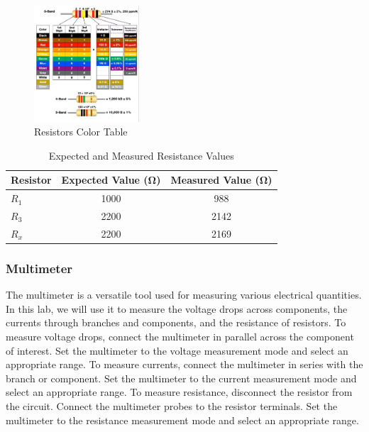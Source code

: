 \documentclass[a4paper, 10pt]{article}
\begin{document}
				\begin{figure}[h!]
					\centering
					\includegraphics[width=0.35\textwidth]{images/ResistorColorCode.png}
					\caption{Resistors Color Table}
					\label{fig:ResistorsColorTable}
				\end{figure}

	
				\begin{table}[h!]
					\centering
					\begin{tabular}{@{}l|S|S@{}} %
						\toprule
						{Resistor} & {Expected Value (\si{\ohm})} & {Measured Value (\si{\ohm})} \\
						\midrule
						$R_1$ & 1000 & 988 \\
						$R_3$ & 2200 & 2142 \\
						$R_x$ & 2200 & 2169 \\
						\bottomrule
					\end{tabular}
					\caption{Expected and Measured Resistance Values}
					\label{tab:resistors}
				\end{table}

			\pagebreak
			\subsubsection{Multimeter}
				The multimeter is a versatile tool used for measuring various electrical quantities. In this lab, we will use it to measure the voltage drops across components, the currents through branches and components, and the resistance of resistors.
				To measure voltage drops, connect the multimeter in parallel across the component of interest. Set the multimeter to the voltage measurement mode and select an appropriate range.
				To measure currents, connect the multimeter in series with the branch or component. Set the multimeter to the current measurement mode and select an appropriate range.
				To measure resistance, disconnect the resistor from the circuit. Connect the multimeter probes to the resistor terminals. Set the multimeter to the resistance measurement mode and select an appropriate range.
\end{document}
